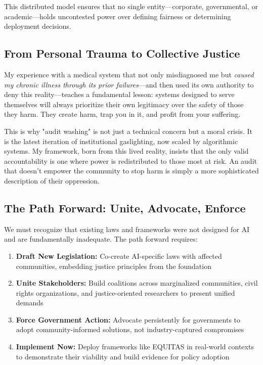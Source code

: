 \documentclass[12pt,letterpaper]{article}
\begin{document}
This distributed model ensures that no single entity—corporate, governmental, or academic—holds uncontested power over defining fairness or determining deployment decisions.

\subsection*{From Personal Trauma to Collective Justice}

\begin{personalreflection}
My experience with a medical system that not only misdiagnosed me but \textit{caused my chronic illness through its prior failures}—and then used its own authority to deny this reality—teaches a fundamental lesson: systems designed to serve themselves will always prioritize their own legitimacy over the safety of those they harm. They create harm, trap you in it, and profit from your suffering.

This is why "audit washing" is not just a technical concern but a moral crisis. It is the latest iteration of institutional gaslighting, now scaled by algorithmic systems. My framework, born from this lived reality, insists that the only valid accountability is one where power is redistributed to those most at risk. An audit that doesn't empower the community to stop harm is simply a more sophisticated description of their oppression.
\end{personalreflection}

\subsection*{The Path Forward: Unite, Advocate, Enforce}

We must recognize that existing laws and frameworks were not designed for AI and are fundamentally inadequate. The path forward requires:

\begin{enumerate}[leftmargin=*,noitemsep,topsep=2pt]
    \item \textbf{Draft New Legislation:} Co-create AI-specific laws with affected communities, embedding justice principles from the foundation
    \item \textbf{Unite Stakeholders:} Build coalitions across marginalized communities, civil rights organizations, and justice-oriented researchers to present unified demands
    \item \textbf{Force Government Action:} Advocate persistently for governments to adopt community-informed solutions, not industry-captured compromises
    \item \textbf{Implement Now:} Deploy frameworks like EQUITAS in real-world contexts to demonstrate their viability and build evidence for policy adoption
\end{enumerate}
\end{document}
